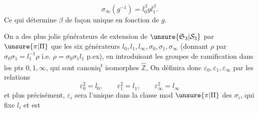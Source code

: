 \[
\sigma_\infty(g^{-1})=l_0^\beta g l_1^\beta.
\]
Ce qui détermine $\beta$ de façon unique en fonction de $g$.


On a des plus jolis générateurs de  extension de $\unsure{\mathfrak S_3|\mathcal S_3}$ par $\unsure{\pi|\Pi}$  que les six générateurs $l_0,l_1,l_\infty,\sigma_0,\sigma_1,\sigma_\infty$ (donnant $\rho$ par $\sigma_0\sigma_1=l_1^{-1}\rho$  i.e. $\rho=\sigma_0\sigma_1l_1$ p.ex), en introduisant les groupes de ramification dans les pts $0,1,\infty$, qui sont canoniq\textsuperscript{t} isomorphes  $\widehat{\mathbb Z}$,
On définira donc $\varepsilon_0,\varepsilon_1,\varepsilon_\infty$ par les relations
\[
\varepsilon_0^2=l_0,\qquad\varepsilon_1^2=l_1,\qquad\varepsilon_\infty^2=l_\infty
\]
et plus précisément, $\varepsilon_i$ sera l'unique   dans la classe mod $\unsure{\pi|\Pi}$ des $\sigma_i$,  qui fixe $l_i$ et est  
